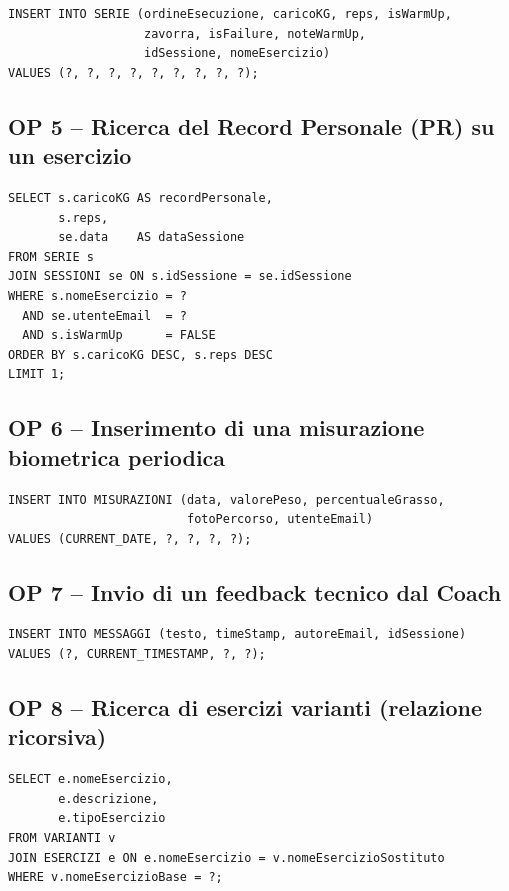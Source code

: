 \documentclass[12pt]{report}
\begin{document}
\begin{lstlisting}[style=sql]
INSERT INTO SERIE (ordineEsecuzione, caricoKG, reps, isWarmUp,
                   zavorra, isFailure, noteWarmUp,
                   idSessione, nomeEsercizio)
VALUES (?, ?, ?, ?, ?, ?, ?, ?, ?);
\end{lstlisting}

\subsection*{OP 5 – Ricerca del Record Personale (PR) su un esercizio}

\begin{lstlisting}[style=sql]
SELECT s.caricoKG AS recordPersonale,
       s.reps,
       se.data    AS dataSessione
FROM SERIE s
JOIN SESSIONI se ON s.idSessione = se.idSessione
WHERE s.nomeEsercizio = ?
  AND se.utenteEmail  = ?
  AND s.isWarmUp      = FALSE
ORDER BY s.caricoKG DESC, s.reps DESC
LIMIT 1;
\end{lstlisting}

\subsection*{OP 6 – Inserimento di una misurazione biometrica periodica}

\begin{lstlisting}[style=sql]
INSERT INTO MISURAZIONI (data, valorePeso, percentualeGrasso,
                         fotoPercorso, utenteEmail)
VALUES (CURRENT_DATE, ?, ?, ?, ?);
\end{lstlisting}

\subsection*{OP 7 – Invio di un feedback tecnico dal Coach}

\begin{lstlisting}[style=sql]
INSERT INTO MESSAGGI (testo, timeStamp, autoreEmail, idSessione)
VALUES (?, CURRENT_TIMESTAMP, ?, ?);
\end{lstlisting}

\subsection*{OP 8 – Ricerca di esercizi varianti (relazione ricorsiva)}

\begin{lstlisting}[style=sql]
SELECT e.nomeEsercizio,
       e.descrizione,
       e.tipoEsercizio
FROM VARIANTI v
JOIN ESERCIZI e ON e.nomeEsercizio = v.nomeEsercizioSostituto
WHERE v.nomeEsercizioBase = ?;
\end{lstlisting}
\end{document}
